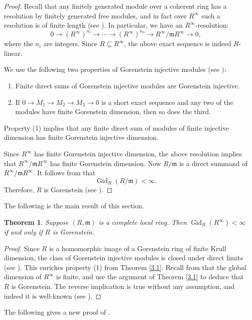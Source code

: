 \documentclass[11pt,a4paper]{amsart}
\numberwithin{equation}{section}
\newtheorem{theorem}{Theorem}[section]
\theoremstyle{definition}
\theoremstyle{remark}
\begin{document}
\begin{proof}
	Recall that any finitely generated module over a coherent ring has a resolution by finitely generated free modules, and in fact over \(R^\infty\) such a resolution is of finite length (see \cite{A}). In particular, we have an \(R^\infty\)-resolution:
	\[
	0 \longrightarrow (R^\infty)^{n_t} \longrightarrow \cdots \longrightarrow (R^\infty)^{n_0} \longrightarrow R^\infty / \mathfrak m R^\infty \longrightarrow 0,
	\]
	where the \(n_i\) are integers. Since \(R \subseteq R^\infty\), the above exact sequence is indeed \(R\)-linear.
	
	We use the following two properties of Gorenstein injective modules (see \cite[Proposition 3.9, Proposition 3.3]{Totally}):
	
	\begin{enumerate}
		\item Finite direct sums of Gorenstein injective modules are Gorenstein injective.
		\item If
		\(
		0 \longrightarrow M_1 \longrightarrow M_2 \longrightarrow M_3 \longrightarrow 0
		\)
		is a short exact sequence and any two of the modules have finite Gorenstein dimension, then so does the third.
	\end{enumerate}
	
	Property (1) implies that any finite direct sum of modules of finite injective dimension has finite Gorenstein injective dimension.
	
	Since \(R^\infty\) has finite Gorenstein injective dimension, the above resolution implies that
	\(
	R^\infty / \mathfrak m R^\infty
	\)
	has finite Gorenstein dimension. Now \(R / \mathfrak m\) is a direct summand of
	\(
	R^\infty / \mathfrak m R^\infty.
	\)
	It follows from \cite[Proposition 3.3]{Totally} that
	\[
	\operatorname{Gid}_R(R / \mathfrak m) < \infty.
	\]
	Therefore, \(R\) is Gorenstein (see \cite[Corollary 3.23]{Totally}).
\end{proof}

The following is the main result of this section.

\begin{theorem}\label{4.2}
	Suppose \((R,\mathfrak m)\) is a complete local ring. Then
	\(
	\operatorname{Gid}_R(R^\infty) < \infty
	\)
	if and only if  \(R\) is Gorenstein.
\end{theorem}

\begin{proof}
	Since \(R\) is a homomorphic image of a Gorenstein ring of finite Krull dimension, the class of Gorenstein injective modules is closed under direct limits (see \cite[Theorem 3.16]{Totally}). This enriches property (1) from Theorem \ref{3.1}. Recall from \cite{BH} that the global dimension of \(R^\infty\) is finite, and use the argument of Theorem \ref{3.1} to deduce that \(R\) is Gorenstein. The reverse implication is true without any assumption, and indeed it is well-known (see \cite[Corollary 3.23]{Totally}).
\end{proof}
The following gives a new proof of  \cite[Example 3.17(1)]{Ryo}.
\end{document}
